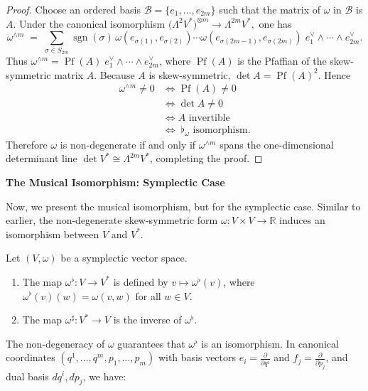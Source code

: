 \begin{proof}
Choose an ordered basis $\mathcal B=\{e_1,\dots,e_{2m}\}$ such that the matrix of $\omega$ in $\mathcal B$ is $A$.  Under the canonical isomorphism
$
\bigl(\Lambda^{2}V^{\!*}\bigr)^{\otimes m}\longrightarrow\Lambda^{2m}V^{\!*},
$
one has
\[
\omega^{\wedge m}
   \;=\;
   \sum_{\sigma\in S_{2m}}
   \operatorname{sgn}(\sigma)\,
   \omega(e_{\sigma(1)},e_{\sigma(2)})\cdots
   \omega(e_{\sigma(2m-1)},e_{\sigma(2m)})\;
   e_{1}^{\vee}\wedge\cdots\wedge e_{2m}^{\vee}.
\]
Thus $\omega^{\wedge m}= \operatorname{Pf}(A)\;e_{1}^{\vee}\wedge\cdots\wedge e_{2m}^{\vee}$, where $\operatorname{Pf}(A)$ is the Pfaffian of the skew-symmetric matrix $A$.  Because $A$ is skew-symmetric, $\det A = \operatorname{Pf}(A)^{2}$.  Hence
\begin{align*}
\omega^{\wedge m}\neq 0 & \Longleftrightarrow \operatorname{Pf}(A)\neq 0 \\ 
          &\Longleftrightarrow \det A\neq 0 \\
          &\Longleftrightarrow A \text{ invertible} \\ 
          & \Longleftrightarrow\; \flat_\omega \text{ isomorphism}.
\end{align*}
Therefore $\omega$ is non-degenerate if and only if $\omega^{\wedge m}$ spans the one-dimensional determinant line $\det V^{\!*}\cong\Lambda^{2m}V^{\!*}$, completing the proof.
\end{proof}

\textbf{The Musical Isomorphism: Symplectic Case}

Now, we present the musical isomorphism, but for the symplectic case. Similar to earlier, the non-degenerate skew-symmetric form $\omega: V \times V \to \mathbb{R}$ induces an isomorphism between $V$ and $V^*$.

\begin{definition} \label{def:symplectic_iso}
Let $(V, \omega)$ be a symplectic vector space.
\begin{enumerate}
    \item The map $\omega^\flat: V \to V^*$ is defined by $v \mapsto \omega^\flat(v)$, where $\omega^\flat(v)(w) = \omega(v, w)$ for all $w \in V$.
    \item The map $\omega^\sharp: V^* \to V$ is the inverse of $\omega^\flat$.
\end{enumerate}
\end{definition}

The non-degeneracy of $\omega$ guarantees that $\omega^\flat$ is an isomorphism. In canonical coordinates $(q^1, \dots, q^m, p_1, \dots, p_m)$ with basis vectors $e_i = \frac{\partial}{\partial q^i}$ and $f_j = \frac{\partial}{\partial p_j}$, and dual basis $dq^i, dp_j$, we have:

